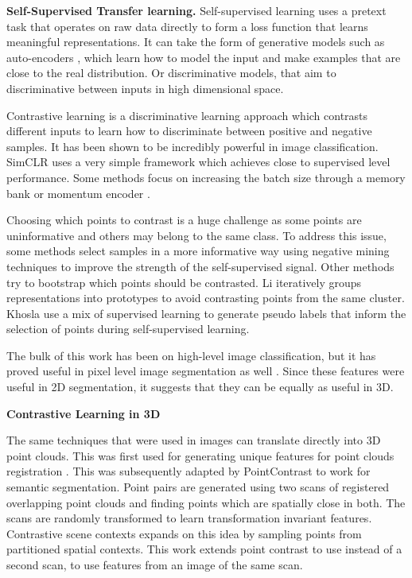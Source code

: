 \documentclass[10pt,twocolumn,letterpaper]{article}
\begin{document}
\textbf{Self-Supervised Transfer learning.} Self-supervised learning uses a pretext task that operates on raw data directly to form a loss function that learns meaningful representations. It can take the form of generative models such as auto-encoders \cite{goodfellow2014generative, Kingma2014}, which learn how to model the input and make examples that are close to the real distribution. Or discriminative models, that aim to discriminative between inputs in high dimensional space.

Contrastive learning is a discriminative learning approach which contrasts different inputs to learn how to discriminate between positive and negative samples. It has been shown to be incredibly powerful in image classification. SimCLR \cite{chen_simple_2020}  uses a very simple framework which achieves close to supervised level performance. Some methods focus on increasing the batch size through a memory bank \cite{wu2018unsupervied} or momentum encoder \cite{he_momentum_2020}.

Choosing which points to contrast is a huge challenge as some points are uninformative and others may belong to the same class. To address this issue, some methods select samples in a more informative way using negative mining techniques \cite{robinson_contrastive_2021, kalantidis_hard_nodate, chuang_debiased_2020, ho_contrastive_nodate} to improve the strength of the self-supervised signal. Other methods try to bootstrap which points should be contrasted. Li \etal \cite{li2021prototypical} iteratively groups representations into prototypes to avoid contrasting points from the same cluster. Khosla \etal \cite{khosla_supervised_2021} use a mix of supervised learning to generate pseudo labels that inform the selection of points during self-supervised learning.

The bulk of this work has been on high-level image classification, but it has proved useful in pixel level image segmentation as well \cite{wang_dense_2021, xie2021propagate, wang2021exploring}. Since these features were useful in 2D segmentation, it suggests that they can be equally as useful in 3D.

\textbf{Contrastive Learning in 3D}

The same techniques that were used in images can translate directly into 3D point clouds. This was first used for generating unique features for point clouds registration \cite{choy2019Fully}. This was subsequently adapted by PointContrast \cite{xie2020pointcontrast} to work for semantic segmentation. Point pairs are generated using two scans of registered overlapping point clouds and finding points which are spatially close in both. The scans are randomly transformed to learn transformation invariant features. Contrastive scene contexts \cite{hou2021Exploring} expands on this idea by sampling points from partitioned spatial contexts. This work extends point contrast to use instead of a second scan, to use features from an image of the same scan.
\end{document}

